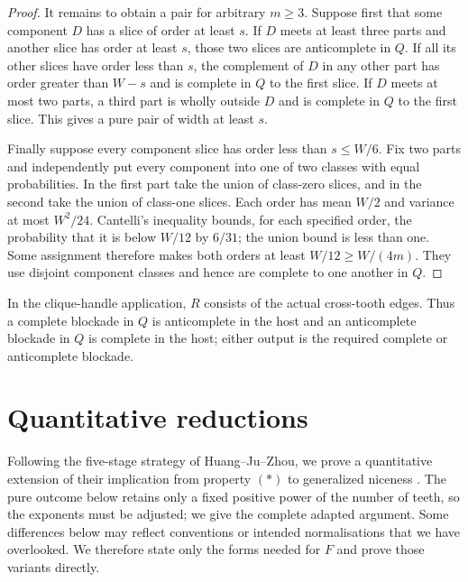 \documentclass[11pt]{article}
\numberwithin{equation}{section}
\theoremstyle{plain}
\theoremstyle{definition}
\begin{document}
\begin{proof}
It remains to obtain a pair for arbitrary $m\geq3$.  Suppose first that
some component $D$ has a slice of order at least $s$.  If $D$ meets at
least three parts and another slice has order at least $s$, those two
slices are anticomplete in $Q$.  If all its other slices have order less
than $s$, the complement of $D$ in any other part has order greater than
$W-s$ and is complete in $Q$ to the first slice.  If $D$ meets at most
two parts, a third part is wholly outside $D$ and is complete in $Q$ to
the first slice.  This gives a pure pair of width at least $s$.

Finally suppose every component slice has order less than
$s\leq W/6$.  Fix two parts and independently put every component into
one of two classes with equal probabilities.  In the first part take the
union of class-zero slices, and in the second take the union of class-one
slices.  Each order has mean $W/2$ and variance at most $W^2/24$.
Cantelli's inequality bounds, for each specified order, the probability
that it is below $W/12$ by $6/31$; the union bound is less than one.  Some
assignment therefore makes both orders at least
$W/12\geq W/(4m)$.  They use disjoint component classes and hence are
complete to one another in $Q$.
\end{proof}

In the clique-handle application, $R$ consists of the actual cross-tooth
edges.  Thus a complete blockade in $Q$ is anticomplete in the host and
an anticomplete blockade in $Q$ is complete in the host; either output is
the required complete or anticomplete blockade.

\section{Quantitative reductions}
\label{sec:hjz-quantitative}

Following the five-stage strategy of Huang--Ju--Zhou, we prove a
quantitative extension of their implication from property $(*)$ to
generalized niceness
\cite[Lemma~1.13 and Section~4.2]{HuangJuZhou2026}.  The pure outcome
below retains only a fixed positive power of the number of teeth, so the
exponents must be adjusted; we give the complete adapted argument.
Some differences below may reflect conventions or intended
normalisations that we have overlooked.  We therefore state only the
forms needed for $F$ and prove those variants directly.
\end{document}

